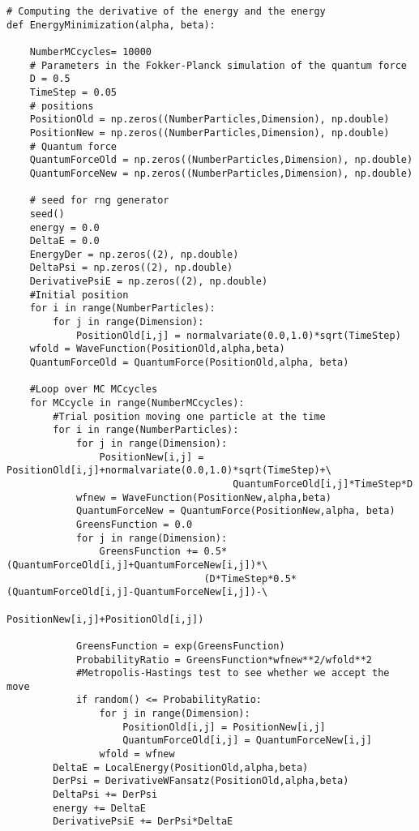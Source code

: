 \documentclass[%
oneside,                 %
final,                   %
10pt]{article}
\begin{document}
\begin{verbatim}
# Computing the derivative of the energy and the energy 
def EnergyMinimization(alpha, beta):

    NumberMCcycles= 10000
    # Parameters in the Fokker-Planck simulation of the quantum force
    D = 0.5
    TimeStep = 0.05
    # positions
    PositionOld = np.zeros((NumberParticles,Dimension), np.double)
    PositionNew = np.zeros((NumberParticles,Dimension), np.double)
    # Quantum force
    QuantumForceOld = np.zeros((NumberParticles,Dimension), np.double)
    QuantumForceNew = np.zeros((NumberParticles,Dimension), np.double)

    # seed for rng generator 
    seed()
    energy = 0.0
    DeltaE = 0.0
    EnergyDer = np.zeros((2), np.double)
    DeltaPsi = np.zeros((2), np.double)
    DerivativePsiE = np.zeros((2), np.double)
    #Initial position
    for i in range(NumberParticles):
        for j in range(Dimension):
            PositionOld[i,j] = normalvariate(0.0,1.0)*sqrt(TimeStep)
    wfold = WaveFunction(PositionOld,alpha,beta)
    QuantumForceOld = QuantumForce(PositionOld,alpha, beta)

    #Loop over MC MCcycles
    for MCcycle in range(NumberMCcycles):
        #Trial position moving one particle at the time
        for i in range(NumberParticles):
            for j in range(Dimension):
                PositionNew[i,j] = PositionOld[i,j]+normalvariate(0.0,1.0)*sqrt(TimeStep)+\
                                       QuantumForceOld[i,j]*TimeStep*D
            wfnew = WaveFunction(PositionNew,alpha,beta)
            QuantumForceNew = QuantumForce(PositionNew,alpha, beta)
            GreensFunction = 0.0
            for j in range(Dimension):
                GreensFunction += 0.5*(QuantumForceOld[i,j]+QuantumForceNew[i,j])*\
	                              (D*TimeStep*0.5*(QuantumForceOld[i,j]-QuantumForceNew[i,j])-\
                                      PositionNew[i,j]+PositionOld[i,j])
      
            GreensFunction = exp(GreensFunction)
            ProbabilityRatio = GreensFunction*wfnew**2/wfold**2
            #Metropolis-Hastings test to see whether we accept the move
            if random() <= ProbabilityRatio:
                for j in range(Dimension):
                    PositionOld[i,j] = PositionNew[i,j]
                    QuantumForceOld[i,j] = QuantumForceNew[i,j]
                wfold = wfnew
        DeltaE = LocalEnergy(PositionOld,alpha,beta)
        DerPsi = DerivativeWFansatz(PositionOld,alpha,beta)
        DeltaPsi += DerPsi
        energy += DeltaE
        DerivativePsiE += DerPsi*DeltaE
            

\end{verbatim}
\end{document}
